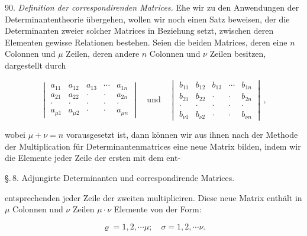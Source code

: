 90. \textit{Definition der correspondirenden Matrices.} Ehe wir zu den Anwendungen der Determinantentheorie übergehen, wollen wir noch einen Satz beweisen, der die Determinanten zweier solcher Matrices in Beziehung setzt, zwischen deren Elementen gewisse Relationen bestehen. Seien die beiden Matrices, deren eine $n$ Colonnen und $\mu$ Zeilen, deren andere $n$ Colonnen und $\nu$ Zeilen besitzen, dargestellt durch

\[
\begin{vmatrix}
a_{11} & a_{12} & a_{13} & \cdots & a_{1n} \\
a_{21} & a_{22} & \cdot & \cdot & a_{2n} \\
\cdot & \cdot & \cdot & \cdot & \cdot \\
a_{\mu 1} & a_{\mu 2} & \cdot & \cdot & a_{\mu n}
\end{vmatrix}
\quad\text{und}\quad
\begin{vmatrix}
b_{11} & b_{12} & b_{13} & \cdots & b_{1n} \\
b_{21} & b_{22} & \cdot & \cdot & b_{2n} \\
\cdot & \cdot & \cdot & \cdot & \cdot \\
b_{\nu 1} & b_{\nu 2} & \cdot & \cdot & b_{\nu n}
\end{vmatrix}\, ,
\]

wobei $\mu + \nu = n$ vorausgesetzt ist, dann können wir aus ihnen nach der Methode der Multiplication für Determinantenmatrices eine neue Matrix bilden, indem wir die Elemente jeder Zeile der ersten mit dem ent-


\S.\,8. Adjungirte Determinanten und correspondirende Matrices.

entsprechenden jeder Zeile der zweiten multipliciren. Diese neue Matrix enthält in $\mu$ Colonnen und $\nu$ Zeilen $\mu\cdot\nu$ Elemente von der Form:


\[
\varrho = 1, 2, \cdots \mu; \quad \sigma = 1, 2, \cdots \nu.
\]

